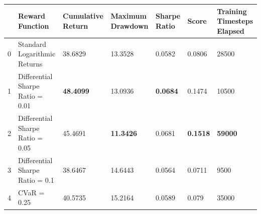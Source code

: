 \begin{tabular}{lllllll}
\toprule
 & Reward Function & Cumulative Return & Maximum Drawdown & Sharpe Ratio & Score & Training Timesteps Elapsed \\
\midrule
0 & Standard Logarithmic Returns & 38.6829 & 13.3528 & 0.0582 & 0.0806 & 28500 \\
1 & Differential Sharpe Ratio = 0.01 & \textbf{48.4099} & 13.0936 & \textbf{0.0684} & 0.1474 & 10500 \\
2 & Differential Sharpe Ratio = 0.05 & 45.4691 & \textbf{11.3426} & 0.0681 & \textbf{0.1518} & \textbf{59000} \\
3 & Differential Sharpe Ratio = 0.1 & 38.6467 & 14.6443 & 0.0564 & 0.0711 & 9500 \\
4 & CVaR = 0.25 & 40.5735 & 15.2164 & 0.0589 & 0.079 & 35000 \\
\bottomrule
\end{tabular}
